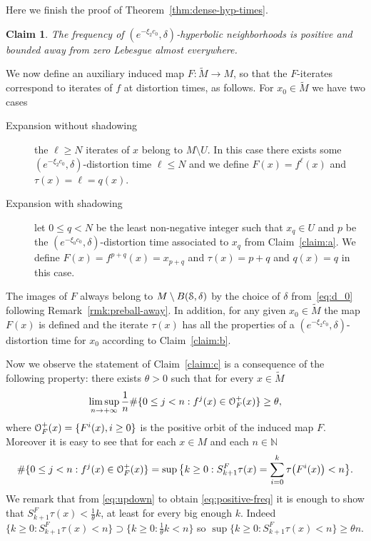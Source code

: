 \documentclass[reqno,12pt,a4paper]{amsart}
\theoremstyle{plain}
\newtheorem{claim}[theorem]{Claim}
\theoremstyle{definition}
\begin{document}
Here we finish the proof of Theorem~\ref{thm:dense-hyp-times}.

\begin{claim}
  \label{claim:c}
  The frequency of $(e^{-\xi_2 c_0},\delta)$-hyperbolic
  neighborhoods is positive and bounded away from zero
  Lebesgue almost everywhere.
\end{claim}

We now define an auxiliary induced map $F:\tilde M\to
M$, so that the $F$-iterates correspond to iterates of $f$
at distortion times, as follows. For $x_0\in\tilde M$ we
have two cases
  \begin{description}
  \item[Expansion without shadowing] the $\ell\ge N$
    iterates of $x$ belong to $M\setminus U$. In this case
    there exists some $(e^{-\xi_2 c_0},\delta)$-distortion
    time $\ell\le N$ and we define $F(x)=f^\ell(x)$ and
    $\tau(x)=\ell=q(x)$.
  \item[Expansion with shadowing] let $0\le q<N$ be the
    least non-negative integer such that $x_q\in U$ and $p$
    be the $(e^{-\xi_0 c_0},\delta)$-distortion time
    associated to $x_q$ from Claim~\ref{claim:a}. We define
    $F(x)=f^{p+q}(x)=x_{p+q}$ and $\tau(x)=p+q$ and $q(x)=q$
    in this case.
  \end{description}
  The images of $F$ always belong to $M\setminus
  B({\EuScript{S}},\delta)$ by the choice of $\delta$
  from~\eqref{eq:d_0} following
  Remark~\ref{rmk:preball-away}.  In addition, for any given
  $x_0\in\tilde M$ the map $F(x)$ is defined and the iterate
  $\tau(x)$ has all the properties of a $(e^{-\xi_2
    c_0},\delta)$-distortion time for $x_0$ according to
  Claim~\ref{claim:b}.

  Now we observe the statement of Claim~\eqref{claim:c}
  is a consequence of the following property: there exists
  $\theta>0$ such that for every $x\in\tilde M$
  \begin{align}\label{eq:positive-freq}
    \limsup_{n\to+\infty}\frac1n\#\{ 0\le j < n :
    f^j(x)\in{\EuScript{O}}^+_F(x)\} \ge\theta,
  \end{align}
  where ${\EuScript{O}}^+_F(x)=\{F^i(x), i\ge0\}$ is the positive orbit
  of the induced map $F$. Moreover it is easy to see that
  for each $x\in M$ and each $n\in{{\mathbb N}}$
  \begin{align}\label{eq:updown}
    \#\{ 0\le j < n : f^j(x)\in{\EuScript{O}}^+_F(x)\}
    =
    \sup\big\{
    k\ge0: S_{k+1}^F\tau(x)=\sum_{i=0}^k
    \tau\big(F^i(x)\big) < n
    \big\}.
  \end{align}
  We remark that from \eqref{eq:updown} to obtain
  \eqref{eq:positive-freq} it is enough to show that
  $S_{k+1}^F \tau(x)< \frac1{\theta}k$, at least for every big
  enough $k$. Indeed
  $\big\{
    k\ge0: S_{k+1}^F\tau(x) < n
    \big\}
    \supset
    \big\{
    k\ge0: \frac1\theta k < n
    \big\}$
   so
   $ \sup\big\{
    k\ge0: S_{k+1}^F\tau(x) < n
    \big\} \ge \theta n.$
\end{document}
